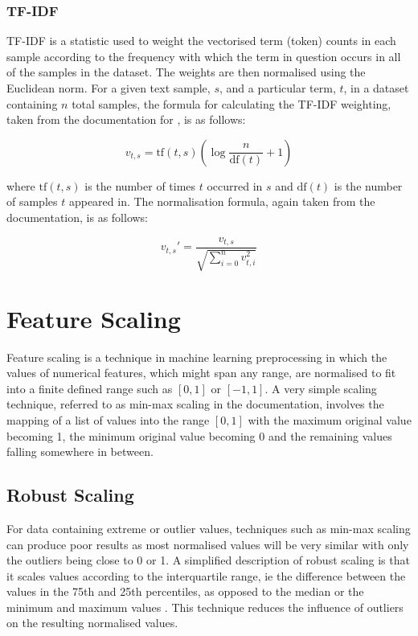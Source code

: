 \subsubsection{TF-IDF}

TF-IDF is a statistic used to weight the vectorised term (token) counts in each sample according to the frequency with which the term in question occurs in all of the samples in the dataset. The weights are then normalised using the Euclidean norm. For a given text sample, $s$, and a particular term, $t$, in a dataset containing $n$ total samples, the formula for calculating the TF-IDF weighting, taken from the documentation for \cite{pedregosa2011scikit}, is as follows:

\begin{equation*}
    v_{t,s} = \mathrm{tf}(t, s) \left( \log{\frac{n}{\mathrm{df}(t)}} + 1 \right)
\end{equation*}

where $\mathrm{tf}(t, s)$ is the number of times $t$ occurred in $s$ and $\mathrm{df}(t)$ is the number of samples $t$ appeared in. The normalisation formula, again taken from the documentation, is as follows:

\begin{equation*}
    v_{t,s}' = \frac{v_{t,s}}{\sqrt{\sum_{i=0}^n v_{t,i}^2}}
\end{equation*}

\section{Feature Scaling}

Feature scaling is a technique in machine learning preprocessing in which the values of numerical features, which might span any range, are normalised to fit into a finite defined range such as $[0,1]$ or $[-1,1]$. A very simple scaling technique, referred to as min-max scaling in the \cite{pedregosa2011scikit} documentation, involves the mapping of a list of values into the range $[0,1]$ with the maximum original value becoming 1, the minimum original value becoming 0 and the remaining values falling somewhere in between.

\subsection{Robust Scaling}

For data containing extreme or outlier values, techniques such as min-max scaling can produce poor results as most normalised values will be very similar with only the outliers being close to 0 or 1. A simplified description of robust scaling is that it scales values according to the interquartile range, ie the difference between the values in the 75th and 25th percentiles, as opposed to the median or the minimum and maximum values \cite{pedregosa2011scikit}. This technique reduces the influence of outliers on the resulting normalised values.

